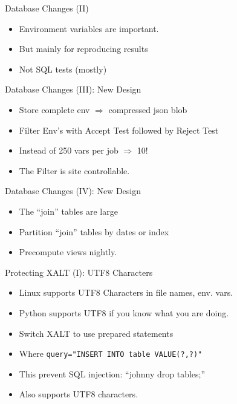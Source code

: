 \documentclass{beamer}
\begin{document}
\begin{frame}{Database Changes (II)}
  \begin{itemize}
    \item Environment variables are important.
    \item But mainly for reproducing results
    \item Not SQL tests (mostly)
  \end{itemize}
\end{frame}

\begin{frame}{Database Changes (III): New Design}
  \begin{itemize}
    \item Store complete env $\Rightarrow$ compressed json blob
    \item Filter Env's with Accept Test followed by Reject Test
    \item Instead of 250 vars per job $\Rightarrow$ 10!
    \item The Filter is site controllable.
  \end{itemize}
\end{frame}

\begin{frame}{Database Changes (IV): New Design}
  \begin{itemize}
    \item The ``join'' tables are large 
    \item Partition ``join'' tables by dates or index
    \item Precompute views nightly.
  \end{itemize}
\end{frame}

\begin{frame}{Protecting XALT (I): UTF8 Characters}
  \begin{itemize}
    \item Linux supports UTF8 Characters in file names, env. vars.
    \item Python supports UTF8 if you know what you are doing.
    \item Switch XALT to use prepared statements
    \item Where \texttt{query="INSERT INTO table VALUE(?,?)"}
    \item This prevent SQL injection: ``johnny drop tables;''
    \item Also supports UTF8 characters.
  \end{itemize}
\end{frame}
\end{document}
